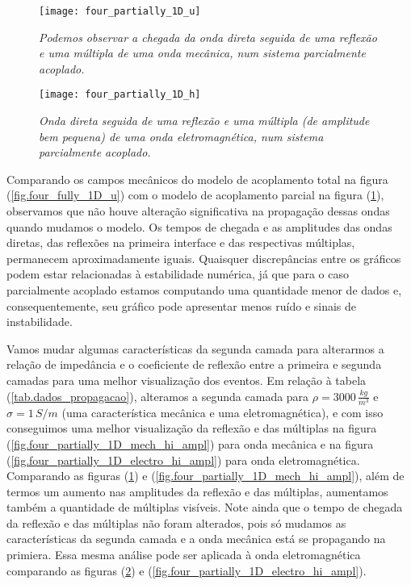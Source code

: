 \begin{figure}
\centering
\texttt{[image: four\_partially\_1D\_u]}\\
\caption{\textit{Podemos observar a chegada da onda direta seguida de uma reflex\~ao e uma m\'ultipla de uma onda mec\^anica, num sistema parcialmente acoplado.}}
\label{fig.four_partially_1D_mech}
\end{figure}

\begin{figure}
\centering
\texttt{[image: four\_partially\_1D\_h]}\\
\caption{\textit{Onda direta seguida de uma reflex\~ao e uma m\'ultipla (de amplitude bem pequena) de uma onda eletromagn\'etica, num sistema parcialmente acoplado.}}
\label{fig.four_partially_1D_eletro}
\end{figure}

Comparando os campos mec\^anicos do modelo de acoplamento total na figura (\ref{fig.four_fully_1D_u}) com o modelo de acoplamento parcial na figura (\ref{fig.four_partially_1D_mech}), observamos que n\~ao houve altera\c{c}\~ao significativa na propaga\c{c}\~ao dessas ondas quando mudamos o modelo. Os tempos de chegada e as amplitudes das ondas diretas, das reflex\~oes na primeira interface e das respectivas m\'ultiplas, permanecem aproximadamente iguais. Quaisquer discrep\^ancias entre os gr\'aficos podem estar relacionadas \`a estabilidade num\'erica, j\'a que para o caso parcialmente acoplado estamos computando uma quantidade menor de dados e, consequentemente, seu gr\'afico pode apresentar menos ru\'ido e sinais de instabilidade. 

Vamos mudar algumas caracter\'isticas da segunda camada para alterarmos a rela\c{c}\~ao de imped\^ancia e o coeficiente de reflex\~ao entre a primeira e segunda camadas para uma melhor visualiza\c{c}\~ao dos eventos. Em rela\c{c}\~ao \`a tabela (\ref{tab.dados_propagacao}), alteramos a segunda camada para $\rho=3000\,\frac{kg}{m^3}$ e $\sigma=1\,S/m$ (uma caracter\'istica mec\^anica e uma eletromagn\'etica), e com isso conseguimos uma melhor visualiza\c{c}\~ao da reflex\~ao e das m\'ultiplas na figura (\ref{fig.four_partially_1D_mech_hi_ampl}) para onda mec\^anica e na figura (\ref{fig.four_partially_1D_electro_hi_ampl}) para onda eletromagn\'etica. Comparando as figuras (\ref{fig.four_partially_1D_mech}) e (\ref{fig.four_partially_1D_mech_hi_ampl}), al\'em de termos  um aumento nas amplitudes da reflex\~ao e das m\'ultiplas, aumentamos tamb\'em a quantidade de m\'ultiplas vis\'iveis. Note ainda que o tempo de chegada da reflex\~ao e das m\'ultiplas n\~ao foram alterados, pois s\'o mudamos as caracter\'isticas da segunda camada e a onda mec\^anica est\'a se propagando na primiera. Essa mesma an\'alise pode ser aplicada \`a onda eletromagn\'etica comparando as figuras (\ref{fig.four_partially_1D_eletro}) e (\ref{fig.four_partially_1D_electro_hi_ampl}).

